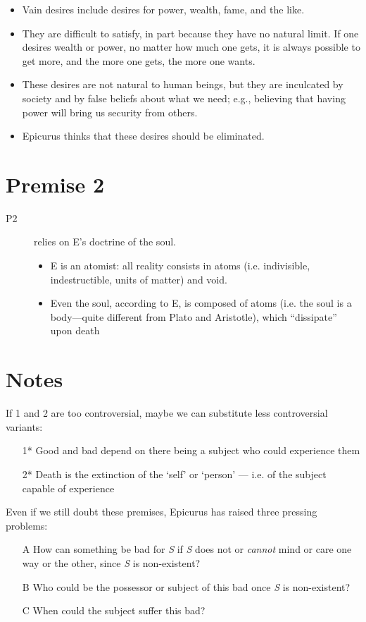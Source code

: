 \documentclass[11pt]{article}
\begin{document}
\begin{enumerate}
  \begin{itemize}
  \item
    Vain desires include desires for power, wealth, fame, and the like.
  \item
    They are difficult to satisfy, in part because they have no natural
    limit. If one desires wealth or power, no matter how much one gets,
    it is always possible to get more, and the more one gets, the more
    one wants.
  \item
    These desires are not natural to human beings, but they are inculcated by  society and by false beliefs about what we need; e.g., believing
    that having power will bring us security from others.
  \item
    Epicurus thinks that these desires should be eliminated.
  \end{itemize}
\end{enumerate}

\section*{Premise 2}
\begin{description}
\item[P2] relies on E's doctrine of the soul. 
\begin{itemize}
\item E is an atomist: all reality consists in atoms (i.e. indivisible, indestructible, units of matter) and void.
\item Even the soul, according to E, is composed of atoms (i.e. the soul is a body---quite different from Plato and Aristotle), which ``dissipate'' upon death
\end{itemize}
\end{description}

\section*{Notes}
If 1 and 2 are too controversial, maybe we can substitute less controversial variants:

\begin{enumerate}
\item[1*] Good and bad depend on there being a subject who could experience them
\item[2*] Death is the extinction of the `self' or `person' --- i.e. of the subject capable of experience
\end{enumerate}
Even if we still doubt these premises, Epicurus has raised three pressing problems: 
\begin{enumerate}
\item[A] How can something be bad for \emph{S} if \emph{S} does not or \emph{cannot} mind or care one way or the other, since \emph{S} is non-existent?
\item[B] Who could be the possessor or subject of this bad once \emph{S} is non-existent?
\item[C] When could the subject suffer this bad?
\end{enumerate}
\end{document}
